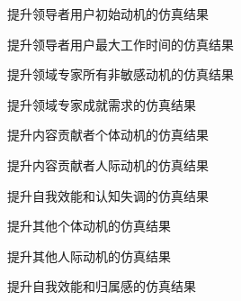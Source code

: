 \documentclass[slidestop,compress,mathserif,table]{beamer}
\begin{document}
   \begin{frame}
     提升领导者用户初始动机的仿真结果
\scalebox{0.8}{}
   \end{frame}

   \begin{frame}
     提升领导者用户最大工作时间的仿真结果
\scalebox{0.8}{}
   \end{frame}

  \begin{frame}
提升领域专家所有非敏感动机的仿真结果
\scalebox{0.8}{}
   \end{frame}

  \begin{frame}
提升领域专家成就需求的仿真结果
\scalebox{0.8}{}
   \end{frame}

  \begin{frame}
提升内容贡献者个体动机的仿真结果
\scalebox{0.8}{}
   \end{frame}

  \begin{frame}
提升内容贡献者人际动机的仿真结果
\scalebox{0.8}{}
   \end{frame}


   \begin{frame}
提升自我效能和认知失调的仿真结果
     \scalebox{0.8}{}
   \end{frame}

 \begin{frame}
提升其他个体动机的仿真结果
     \scalebox{0.8}{}
   \end{frame}
 \begin{frame}
提升其他人际动机的仿真结果
     \scalebox{0.8}{}
   \end{frame}

 \begin{frame}
提升自我效能和归属感的仿真结果
     \scalebox{0.8}{}
   \end{frame}
\end{document}

